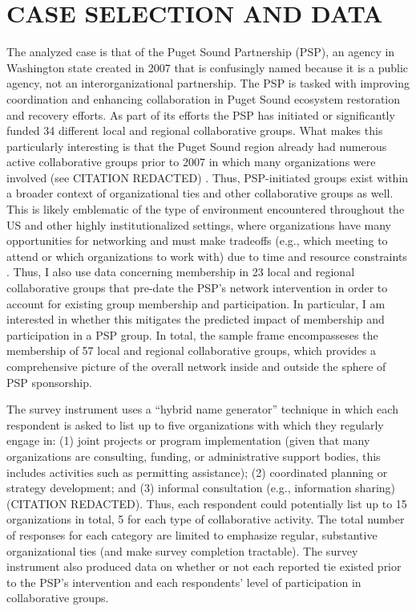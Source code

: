 \documentclass[12pt,a4paper,titlepage]{article}
\begin{document}
\section{\bf\MakeUppercase{Case Selection and Data}}

The analyzed case is that of the Puget Sound Partnership (PSP), an agency in Washington state created in 2007 that is confusingly named because it is a public agency, not an interorganizational partnership. The PSP is tasked with improving coordination and enhancing collaboration in Puget Sound ecosystem restoration and recovery efforts. As part of its efforts the PSP has initiated or significantly funded 34 different local and regional collaborative groups. What makes this particularly interesting is that the Puget Sound region already had numerous active collaborative groups prior to 2007 in which many organizations were involved (see CITATION REDACTED) . Thus, PSP-initiated groups exist within a broader context of organizational ties and other collaborative groups as well. This is likely emblematic of the type of environment encountered throughout the US and other highly institutionalized settings, where organizations have many opportunities for networking and must make tradeoffs (e.g., which meeting to attend or which organizations to work with) due to time and resource constraints \parencite{lubell2010}. Thus, I also use data concerning membership in 23 local and regional collaborative groups that pre-date the PSP’s network intervention in order to account for existing group membership and participation. In particular, I am interested in whether this mitigates the predicted impact of membership and participation in a PSP group. In total, the sample frame encompasseses the membership of 57 local and regional collaborative groups, which provides a comprehensive picture of the overall network inside and outside the sphere of PSP sponsorship.

The survey instrument uses a “hybrid name generator” technique \parencite{henry2012,lubell2011-a} in which each respondent is asked to list up to five organizations with which they regularly engage in: (1) joint projects or program implementation (given that many organizations are consulting, funding, or administrative support bodies, this includes activities such as permitting assistance); (2) coordinated planning or strategy development; and (3) informal consultation (e.g., information sharing) (CITATION REDACTED). Thus, each respondent could potentially list up to 15 organizations in total, 5 for each type of collaborative activity. The total number of responses for each category are limited to emphasize regular, substantive organizational ties (and make survey completion tractable). The survey instrument also produced data on whether or not each reported tie existed prior to the PSP’s intervention and each respondents’ level of participation in collaborative groups.
\end{document}
